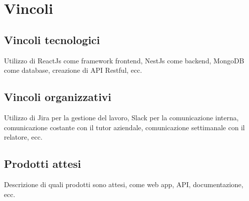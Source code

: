 \section{Vincoli}
\label{sez:vincoli}

\subsection{Vincoli tecnologici}
\label{subsec:vincoli-tecnologici}

Utilizzo di ReactJs come framework frontend, NestJs come backend, MongoDB come database, creazione di API Restful, ecc.

\subsection{Vincoli organizzativi}
\label{subsec:vincoli-organizzativi}

Utilizzo di Jira per la gestione del lavoro, Slack per la comunicazione interna, comunicazione costante con il tutor aziendale, comunicazione settimanale con il relatore, ecc.

\subsection{Prodotti attesi}
\label{subsec:prodotti-attesi}

Descrizione di quali prodotti sono attesi, come web app, API, documentazione, ecc.\\